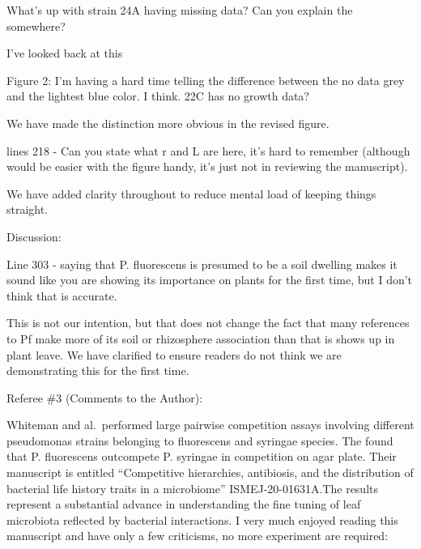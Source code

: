 \documentclass[11pt,]{article}
\begin{document}
\begin{blockquote}
What's up with strain 24A having missing data? Can you explain the
somewhere?
\end{blockquote}

I've looked back at this

\begin{blockquote}
Figure 2: I'm having a hard time telling the difference between the no
data grey and the lightest blue color. I think. 22C has no growth data?
\end{blockquote}

We have made the distinction more obvious in the revised figure.

\begin{blockquote}
lines 218 - Can you state what r and L are here, it's hard to remember
(although would be easier with the figure handy, it's just not in
reviewing the manuscript).
\end{blockquote}

We have added clarity throughout to reduce mental load of keeping things
straight.

\begin{blockquote}
Discussion:
\end{blockquote}

\begin{blockquote}
Line 303 - saying that P. fluorescens is presumed to be a soil dwelling
makes it sound like you are showing its importance on plants for the
first time, but I don't think that is accurate.
\end{blockquote}

This is not our intention, but that does not change the fact that many
references to Pf make more of its soil or rhizosphere association than
that is shows up in plant leave. We have clarified to ensure readers do
not think we are demonstrating this for the first time.

\begin{blockquote}
Referee \#3 (Comments to the Author):
\end{blockquote}

\begin{blockquote}
Whiteman and al.~performed large pairwise competition assays involving
different pseudomonas strains belonging to fluorescens and syringae
species. The found that P. fluorescens outcompete P. syringae in
competition on agar plate. Their manuscript is entitled ``Competitive
hierarchies, antibiosis, and the distribution of bacterial life history
traits in a microbiome'' ISMEJ-20-01631A.The results represent a
substantial advance in understanding the fine tuning of leaf microbiota
reflected by bacterial interactions. I very much enjoyed reading this
manuscript and have only a few criticisms, no more experiment are
required:
\end{blockquote}
\end{document}

